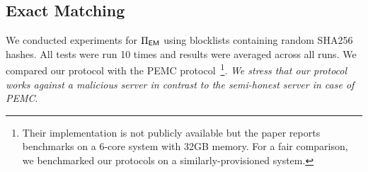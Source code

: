 



\subsection{Exact Matching}
%
We conducted experiments for $\Pi_{\mathsf{EM}}$ using blocklists containing random SHA256 hashes. All tests were run 10 times and results were averaged across all runs. We compared our protocol with the PEMC protocol~\cite{kulshrestha2021identifying}\footnote{Their implementation is not publicly available but the paper reports benchmarks on a 6-core system with 32GB memory. For a fair comparison, we benchmarked our protocols on a similarly-provisioned system.}. \emph{We stress that our protocol works against a malicious server in contrast to the semi-honest server in case of PEMC}. 



%
%



